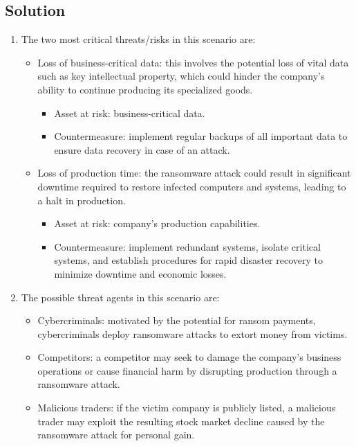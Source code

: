 \subsection{Solution}
\begin{enumerate}
    \item The two most critical threats/risks in this scenario are:
    \begin{itemize}
        \item Loss of business-critical data: this involves the potential loss of vital data such as key intellectual property, which could hinder the company's ability to continue producing its specialized goods.
            \begin{itemize}
                \item Asset at risk: business-critical data.
                \item Countermeasure: implement regular backups of all important data to ensure data recovery in case of an attack.
            \end{itemize}
        \item Loss of production time: the ransomware attack could result in significant downtime required to restore infected computers and systems, leading to a halt in production.
            \begin{itemize}
                \item Asset at risk: company's production capabilities.
                \item Countermeasure: implement redundant systems, isolate critical systems, and establish procedures for rapid disaster recovery to minimize downtime and economic losses.
            \end{itemize}
    \end{itemize}
    \item The possible threat agents in this scenario are:
        \begin{itemize}
            \item Cybercriminals: motivated by the potential for ransom payments, cybercriminals deploy ransomware attacks to extort money from victims.
            \item Competitors: a competitor may seek to damage the company's business operations or cause financial harm by disrupting production through a ransomware attack.
            \item Malicious traders: if the victim company is publicly listed, a malicious trader may exploit the resulting stock market decline caused by the ransomware attack for personal gain.
        \end{itemize}
\end{enumerate}